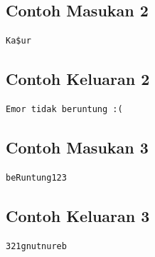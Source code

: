 \documentclass{article}
\begin{document}
\begin{multicols}{2}
\subsection*{Contoh Masukan 2}
\begin{lstlisting}
Ka$ur
\end{lstlisting}
\columnbreak
\subsection*{Contoh Keluaran 2}
\begin{lstlisting}
Emor tidak beruntung :(
\end{lstlisting}
\vfill
\null
\end{multicols}

\begin{multicols}{2}
\subsection*{Contoh Masukan 3}
\begin{lstlisting}
beRuntung123
\end{lstlisting}
\columnbreak
\subsection*{Contoh Keluaran 3}
\begin{lstlisting}
321gnutnureb
\end{lstlisting}
\vfill
\null
\end{multicols}

\pagebreak
\end{document}

